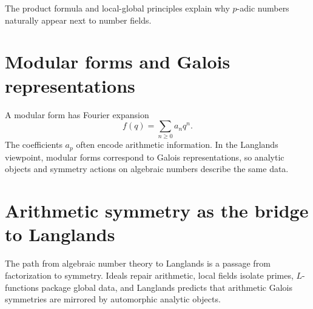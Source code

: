 The product formula and local-global principles explain why \(p\)-adic numbers naturally appear next to number fields.

\section{Modular forms and Galois representations}

A modular form has Fourier expansion
\[
  f(q)=\sum_{n\ge0}a_nq^n.
\]
The coefficients \(a_p\) often encode arithmetic information.  In the Langlands viewpoint, modular forms correspond to Galois representations, so analytic objects and symmetry actions on algebraic numbers describe the same data.

\section{Arithmetic symmetry as the bridge to Langlands}

The path from algebraic number theory to Langlands is a passage from factorization to symmetry.  Ideals repair arithmetic, local fields isolate primes, \(L\)-functions package global data, and Langlands predicts that arithmetic Galois symmetries are mirrored by automorphic analytic objects.
